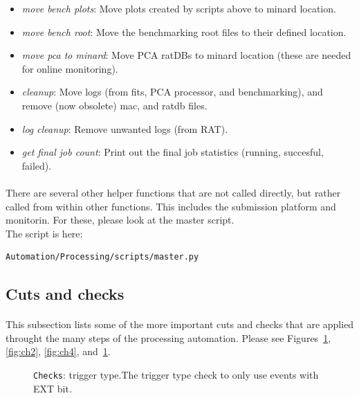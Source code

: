 \documentclass[12pt]{article}
\begin{document}
\begin{itemize}
	\item \textit{move bench plots}: Move plots created by scripts above to minard location.
	\item \textit{move bench root}: Move the benchmarking root files to their defined location.
	\item \textit{move pca to minard}: Move PCA ratDBs to minard location (these are needed for online monitoring).
	\item \textit{cleanup}: Move logs (from fits, PCA processor, and benchmarking), and remove (now obsolete) mac, and ratdb files.
	\item \textit{log cleanup}: Remove unwanted logs (from RAT).
	\item \textit{get final job count}: Print out the final job statistics (running, succesful, failed).
\end{itemize}

\paragraph{}
There are several other helper functions that are not called directly, but rather called from within other functions. This includes the submission platform and monitorin. For these, please look at the master script.\\
The script is here:
\begin{lstlisting}
Automation/Processing/scripts/master.py
\end{lstlisting}

\clearpage

\subsection{Cuts and checks}
\paragraph{}
This subsection lists some of the more important cuts and checks that are applied throught the many steps of the processing automation. Please see Figures~\ref{fig:ch1}, \ref{fig:ch2}, \ref{fig:ch4}, and~\ref{fig:ch1}.

\begin{figure}
\centering
\noindent{}
  \caption{\centering \texttt{Checks}: trigger type.\hspace{\textwidth}The trigger type check to only use events with EXT bit.}
  \label{fig:ch1}
\end{figure}
\end{document}
